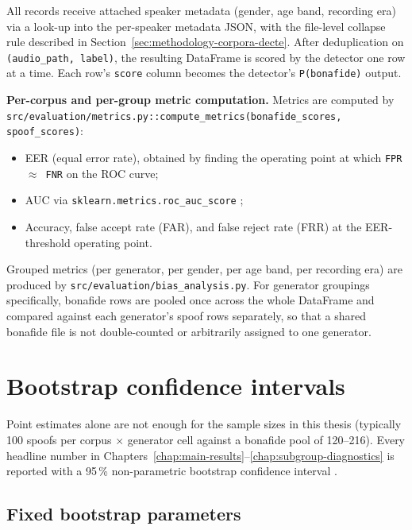 All records receive attached speaker metadata (gender, age band,
recording era) via a look-up into the per-speaker metadata JSON,
with the file-level collapse rule described in
Section~\ref{sec:methodology-corpora-decte}. After deduplication on
\texttt{(audio\_path, label)}, the resulting DataFrame is scored by
the detector one row at a time. Each row's \texttt{score} column
becomes the detector's \texttt{P(bonafide)} output.

\textbf{Per-corpus and per-group metric computation.} Metrics are computed
by \texttt{src/evaluation/metrics.py::compute\_metrics(bonafide\_scores, spoof\_scores)}:

\begin{itemize}
    \item EER (equal error rate), obtained by finding the operating point at
        which \texttt{FPR $\approx$ FNR} on the ROC curve;
    \item AUC via \texttt{sklearn.metrics.roc\_auc\_score} \cite{Fawcett2006_ROC};
    \item Accuracy, false accept rate (FAR), and false reject rate (FRR) at
        the EER-threshold operating point.
\end{itemize}

Grouped metrics (per generator, per gender, per age band, per
recording era) are produced by
\texttt{src/evaluation/bias\_analysis.py}. For generator groupings
specifically, bonafide rows are pooled once across the whole
DataFrame and compared against each generator's spoof rows
separately, so that a shared bonafide file is not double-counted or
arbitrarily assigned to one generator.


\section{Bootstrap confidence intervals}
\label{sec:methodology-bootstrap}

Point estimates alone are not enough for the sample sizes in this
thesis (typically 100 spoofs per corpus $\times$ generator cell
against a bonafide pool of 120--216). Every headline number in
Chapters~\ref{chap:main-results}--\ref{chap:subgroup-diagnostics} is
reported with a 95\,\% non-parametric bootstrap confidence interval
\cite{Efron1993_Bootstrap}.

\subsection{Fixed bootstrap parameters}
\label{sec:methodology-bootstrap-params}

